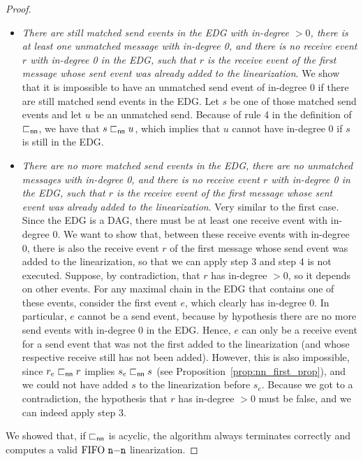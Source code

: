 \begin{proof}
\begin{itemize}
	\item \emph{There are still matched send events in the EDG with in-degree $>0$, there is at least one unmatched message with in-degree 0, and there is no receive event $r$ with in-degree 0 in the EDG, such that $r$ is the receive event of the first message whose sent event was already added to the linearization}. We show that it is impossible to have an unmatched send event of in-degree 0 if there are still matched send events in the EDG. Let $s$ be one of those matched send events and let $u$ be an unmatched send. Because of rule 4 in the definition of $\sqsubset_{\mathsf{nn}}$, we have that $s \sqsubset_{\mathsf{nn}} u$, which implies that $u$ cannot have in-degree 0 if $s$ is still in the EDG.
	\item \emph{There are no more matched send events in the EDG, there are no unmatched messages with in-degree 0, and there is no receive event $r$ with in-degree 0 in the EDG, such that $r$ is the receive event of the first message whose sent event was already added to the linearization}. Very similar to the first case. Since the EDG is a DAG, there must be at least one receive event with in-degree 0. We want to show that, between these receive events with in-degree 0, there is also the receive event $r$ of the first message whose send event was added to the linearization, so that we can apply step 3 and step 4 is not executed. Suppose, by contradiction, that $r$ has in-degree $>0$, so it depends on other events. For any maximal chain in the EDG that contains one of these events, consider the first event $e$, which clearly has in-degree 0. In particular, $e$ cannot be a send event, because by hypothesis there are no more send events with in-degree 0 in the EDG. Hence, $e$ can only be a receive event for a send event that was not the first added to the linearization (and whose respective receive still has not been added). However, this is also impossible, since $r_e \sqsubset_{\mathsf{nn}} r$ implies $s_e \sqsubset_{\mathsf{nn}} s$ (see Proposition~\ref{prop:nn_first_prop}), and we could not have added $s$ to the linearization before $s_e$. Because we got to a contradiction, the hypothesis that $r$ has in-degree $>0$ must be false, and we can indeed apply step 3.
\end{itemize}
We showed that, if $\sqsubset_{\mathsf{nn}}$ is acyclic, the algorithm always terminates correctly and computes a valid $\text{FIFO } \mathtt{n\mathsf{-}n}$ linearization.
\end{proof}
